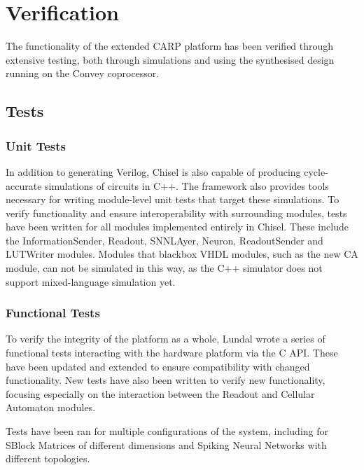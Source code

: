
\chapter{Verification}
\label{chp:verification}

The functionality of the extended CARP platform has been verified through
extensive testing, both through simulations and using the synthesised design
running on the Convey coprocessor.

\section{Tests}
\label{sec:test}

\subsection{Unit Tests}
\label{sec:unit-tests}

In addition to generating Verilog, Chisel is also capable of producing
cycle-accurate simulations of circuits in C++. The framework also provides tools
necessary for writing module-level unit tests that target these simulations. To
verify functionality and ensure interoperability with surrounding modules, tests
have been written for all modules implemented entirely in Chisel. These include
the InformationSender, Readout, SNNLAyer, Neuron, ReadoutSender and LUTWriter
modules. Modules that blackbox VHDL modules, such as the new CA module, can not
be simulated in this way, as the C++ simulator does not support mixed-language
simulation yet.

\subsection{Functional Tests}
\label{sec:functional-test}

To verify the integrity of the platform as a whole, Lundal wrote a series of
functional tests interacting with the hardware platform via the C API. These
have been updated and extended to ensure compatibility with changed
functionality. New tests have also been written to verify new functionality,
focusing especially on the interaction between the Readout and Cellular Automaton
modules.

Tests have been ran for multiple configurations of the system, including
for SBlock Matrices of different dimensions and Spiking Neural Networks with
different topologies.

